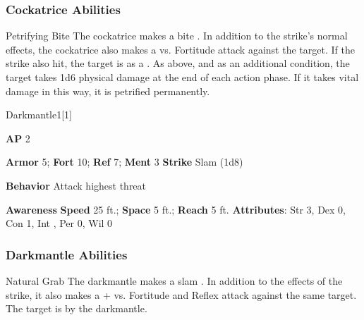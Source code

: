 \subsubsection{Cockatrice Abilities}

\begin{ability}{Petrifying Bite}
The cockatrice makes a bite .
In addition to the strike's normal effects, the cockatrice also makes a  vs. Fortitude attack against the target.
\hit If the strike also hit, the target is  as a .
\crit As above, and as an additional condition, the target takes 1d6 physical damage at the end of each action phase.
If it takes vital damage in this way, it is petrified permanently.
\end{ability}

\begin{monsection}{Darkmantle}{1}[1]
\vspace{-1em}\vspace{-1em}
\begin{spellcontent}
\begin{spelltargetinginfo}
{\textbf{AP} 2}

\pari \textbf{Armor} 5;
\textbf{Fort} 10;
\textbf{Ref} 7;
\textbf{Ment} 3
\pari \textbf{Strike} Slam  (1d8)



\pari \textbf{Behavior} Attack highest threat
\end{spelltargetinginfo}
\end{spellcontent}

\begin{monsterfooter}
\pari \textbf{Awareness} 
\pari \textbf{Speed} 25 ft.;
\textbf{Space} 5 ft.;
\textbf{Reach} 5 ft.
\pari \textbf{Attributes}:
Str 3,
Dex 0,
Con 1,
Int ,
Per 0,
Wil 0
\end{monsterfooter}
\end{monsection}


\subsubsection{Darkmantle Abilities}

\begin{ability}{Natural Grab}
The darkmantle makes a slam .
In addition to the effects of the strike, it also makes a + vs. Fortitude and Reflex attack against the same target.
\hit The target is  by the darkmantle.
\end{ability}

